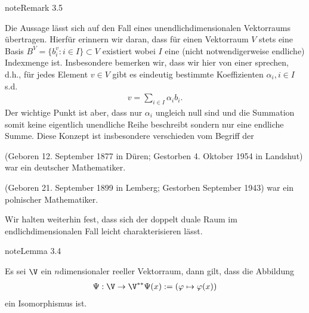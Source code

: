 \documentclass[letterpaper,10pt,english]{jupyterBook}
\begin{document}
\label{vektoranalysis/multilinear:remark-11}
\begin{sphinxadmonition}{note}{Remark 3.5}



\sphinxAtStartPar
Die Aussage lässt sich auf den Fall eines unendlich\sphinxhyphen{}dimensionalen Vektorraums übertragen. Hierfür erinnern wir daran, dass für einen Vektorraum \(V\) stets eine Basis \(B^V = \{b_i^v:i\in I\}\subset V\) existiert wobei \(I\) eine (nicht notwendigerweise endliche) Indexmenge ist. Insbesondere bemerken wir, dass wir hier von einer  sprechen, d.h., für jedes Element \(v\in V\) gibt es eindeutig bestimmte Koeffizienten \(\alpha_i, i\in I\) s.d.
\begin{equation*}
\begin{split}v = \sum_{i\in I} \alpha_i b_i.\end{split}
\end{equation*}
\sphinxAtStartPar
Der wichtige Punkt ist aber, dass nur  \(\alpha_i\) ungleich null sind und die Summation somit keine eigentlich unendliche Reihe beschreibt sondern nur eine endliche Summe. Diese Konzept ist insbesondere verschieden vom Begriff der 
\end{sphinxadmonition}

\begin{sphinxShadowBox}

\sphinxAtStartPar
{} (Geboren 12. September 1877 in Düren; Gestorben 4. Oktober 1954 in Landshut) war ein deutscher Mathematiker.
\end{sphinxShadowBox}

\begin{sphinxShadowBox}

\sphinxAtStartPar
{} (Geboren 21. September 1899 in Lemberg; Gestorben September 1943) war ein polnischer Mathematiker.
\end{sphinxShadowBox}

\sphinxAtStartPar
Wir halten weiterhin fest, dass sich der doppelt duale Raum im endlich\sphinxhyphen{}dimensionalen Fall leicht charakterisieren lässt.
\label{vektoranalysis/multilinear:lem:doubledual}
\begin{sphinxadmonition}{note}{Lemma 3.4}



\sphinxAtStartPar
Es sei \(\V\) ein \(n\)\sphinxhyphen{}dimensionaler reeller Vektorraum, dann gilt, dass die Abbildung
\begin{equation*}
\begin{split}\Psi:\V\rightarrow \V^{\ast\ast}
\Psi(x) := (\varphi\mapsto \varphi(x))\end{split}
\end{equation*}
\sphinxAtStartPar
ein Isomorphismus ist.
\end{sphinxadmonition}
\end{document}
